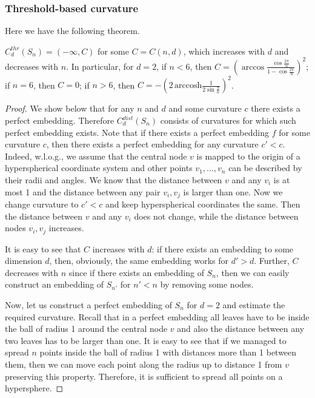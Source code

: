 \documentclass[runningheads]{llncs}
\newcommand{\ch}[1]{{\color{red} #1}}
\begin{document}
\subsubsection{Threshold-based curvature} 
Here we have the following theorem.

\begin{theorem}\label{thm:star_threshold}
$C_d^{thr}(S_n) = (-\infty, C)$ for some $C = C(n,d)$, which increases with $d$ and decreases with $n$. In particular, for $d = 2$, if $n < 6$, then $C = \left(\arccos \frac{\cos \frac{2\pi}{n}}{1 - \cos \frac{2\pi}{n}}\right)^2$; if $n = 6$, then $C = 0$; if $n > 6$, then $C = - \left(2\,\mathrm{arccosh}\frac{1}{2\sin \frac{\pi}{n}}\right)^2$.
\end{theorem}

\begin{proof}

We show below that for any $n$ and $d$ and some curvature $c$ there exists a perfect embedding.
Therefore $C_d^{dist}(S_n)$ consists of curvatures for which such perfect embedding exists. 
Note that if there exists a perfect embedding $f$ for some curvature $c$, then there exists a perfect embedding for any curvature $c' < c$. Indeed, w.l.o.g., we assume that the central node $v$ is mapped to the origin of a hyperspherical coordinate system and other points $v_1, \ldots, v_n$ can be described by their radii and angles. We know that the distance between $v$ and any $v_i$ is at most 1 and the distance between any pair $v_i, v_j$ is larger than one. Now we change curvature to $c' < c$ and keep hyperspherical coordinates the same. Then the distance between $v$ and any $v_i$ does not change, while the distance between nodes $v_i, v_j$ increases.

It is easy to see that $C$ increases with $d$: if there exists an embedding to some dimension $d$, then, obviously, the same embedding works for $d' > d$. Further, $C$ decreases with $n$ since if there \ch{exists an embedding} of $S_n$, then we can easily construct an embedding of $S_{n'}$ for $n' < n$ by removing some nodes. 

Now, let us construct a perfect embedding of $S_n$ for $d = 2$
and estimate the required curvature.
Recall that in a perfect embedding all leaves have to be inside the ball of radius 1 around the central node $v$ and also the distance between any two leaves has to be larger than one. 
It is easy to see that if we managed to spread $n$ points inside the ball of radius 1 with distances more than 1 between them, then we can move each point along the radius up to distance 1 from $v$ preserving this property. Therefore, it is sufficient to spread all points on a hypersphere. 


\end{proof}
\end{document}
